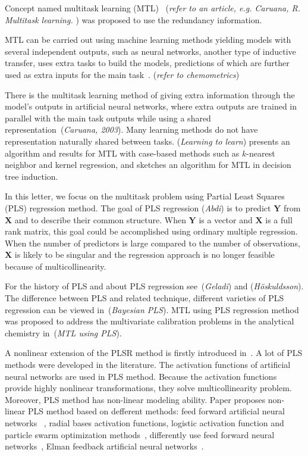 \documentclass[12pt,twoside]{article}
\newcommand{\bY}{\mathbf{Y}}
\newcommand{\bX}{\mathbf{X}}
\begin{document}
	Concept named multitask learning (MTL)~\cite{Adolph, Evgeniou2007} (\textit{refer to an article, e.g. Caruana, R. Multitask learning.}
	) was proposed to use the redundancy information.

	MTL can be carried out using machine learning methods yielding models with several independent outputs, such as neural networks, another type of inductive transfer, uses extra tasks to build the models, predictions of which are further used as extra inputs for the main task~\cite{Varnek2012}. (\textit{refer to chemometrics})

	There is the multitask learning method of giving extra information through the model’s outputs in artificial neural networks, where extra outputs are trained in parallel with the main task outputs while using a shared representation~\cite{Caruana2003}(\textit{Caruana, 2003}). Many learning methods do not have representation naturally shared between tasks. \cite{Adolph} (\textit{Learning to learn}) presents an algorithm and results for MTL with case-based methods such as $k$-nearest neighbor and kernel regression, and sketches an algorithm for MTL in decision tree induction.  


	In this letter, we focus on the multitask problem using Partial Least Squares (PLS) regression method.
	The goal of PLS regression \cite{Abdi2003}(\textit{Abdi}) is to predict $\bY$ from $\bX$ and to describe their common structure. When $\bY$ is a vector and $\bX$ is a full rank matrix, this goal could be accomplished using ordinary multiple regression. When the number of predictors is large compared to the number of observations, $\bX$ is likely to be singular and the regression approach is no longer feasible because of multicollinearity. 

	For the history of PLS and about PLS regression see~\cite{Geladi1988, Hoskuldsson1988}(\textit{Geladi}) and (\textit{Höskuldsson}). 
	The difference between PLS and related technique, different varieties of PLS regression can be viewed in~\cite{Lehky2014}(\textit{Bayesian PLS}).
	MTL using PLS regression method was proposed to address the multivariate calibration problems in the analytical chemistry in~\cite{Lu2004}(\textit{MTL using PLS}). 

	A nonlinear extension of the PLSR method is firstly introduced in~\cite{Frank1990}. A lot of PLS methods were developed in the literature. The activation functions of artificial neural networks are used in PLS method. Because the activation functions provide highly nonlinear transformations, they solve multicollinearity problem. Moreover, PLS method has non-linear modeling ability. Paper proposes non-linear PLS method based on defferent methods: feed forward artificial neural networks ~\cite{Mcavovt1992}, radial bases activation functions\cite{Yan2003}, logistic activation function and particle swarm optimization methods~\cite{Zhou2007}, differently use feed forward neural networks~\cite{Xuefeng2010}, Elman feedback artificial neural networks~\cite{Bulut2014}.
\end{document}
